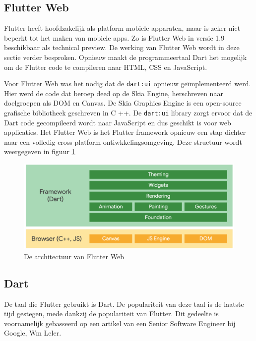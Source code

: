 
\subsection{Flutter Web}
Flutter heeft hoofdzakelijk als platform mobiele apparaten, maar is zeker niet beperkt tot het maken van mobiele apps. Zo is Flutter Web in versie 1.9 beschikbaar als technical preview. De werking van Flutter Web wordt in deze sectie verder besproken.
\newline
Opnieuw maakt de programmeertaal Dart het mogelijk om de Flutter code te compileren naar HTML, CSS en JavaScript.

Voor Flutter Web was het nodig dat de \verb|dart:ui| opnieuw geïmplementeerd werd. Hier werd de code dat beroep deed op de Skia Engine, herschreven naar doelgroepen als DOM en Canvas. De Skia Graphics Engine is een open-source grafische bibliotheek geschreven in C ++. De \verb|dart:ui| library zorgt ervoor dat de Dart code gecompileerd wordt naar JavaScript en dus geschikt is voor web applicaties. 
\newline
Het Flutter Web is het Flutter framework opnieuw een stap dichter naar een volledig cross-platform ontiwkkelingsomgeving.
Deze structuur wordt weergegeven in figuur \ref{fig:flutter-web-architecture}
\begin{figure}[H]
    \includegraphics[width=\linewidth]{img/stand-van-zaken/flutter-web-architecture.png}
    \caption{De architectuur van Flutter Web}
    \label{fig:flutter-web-architecture}
\end{figure}


\subsection{Dart}
De taal die Flutter gebruikt is Dart. De populariteit van deze taal is de laatste tijd gestegen, mede dankzij de populariteit van Flutter.
Dit gedeelte is voornamelijk gebasseerd op een artikel van een Senior Software Engineer bij Google, Wm Leler.

